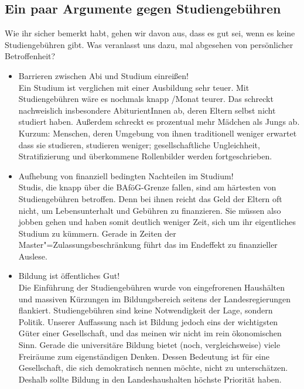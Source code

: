 \subsection*{Ein paar Argumente gegen Studiengebühren}

Wie ihr sicher bemerkt habt, gehen wir davon aus, dass es gut sei, wenn es
keine Studiengebühren gibt. Was veranlasst uns dazu, mal abgesehen von
persönlicher Betroffenheit?
\begin{itemize}
\item {Barrieren zwischen Abi und Studium einreißen!}\\Ein Studium ist
    verglichen mit einer Ausbildung sehr teuer. Mit Studiengebühren wäre es
    nochmals knapp /Monat teurer. Das schreckt nachweislich insbesondere
    AbiturientInnen ab, deren Eltern selbst nicht studiert haben. Außerdem schreckt
    es prozentual mehr Mädchen als Jungs ab. Kurzum: Menschen, deren Umgebung von
    ihnen traditionell weniger erwartet dass sie studieren, studieren weniger;
    gesellschaftliche Ungleichheit, Stratifizierung und überkommene Rollenbilder
    werden fortgeschrieben.
\item {Aufhebung von finanziell bedingten Nachteilen im Studium!}\\Studis, die
    knapp über die BAföG-Grenze fallen, sind am härtesten von Studiengebühren
    betroffen. Denn bei ihnen reicht das Geld der Eltern oft nicht, um
    Lebensunterhalt und Gebühren zu finanzieren. Sie müssen also jobben gehen und
    haben somit deutlich weniger Zeit, sich um ihr eigentliches Studium zu kümmern.
    Gerade in Zeiten der Master"=Zulassungsbeschränkung führt das im Endeffekt zu
    finanzieller Auslese.
\item {Bildung ist öffentliches Gut!}\\Die Einführung der Studiengebühren wurde
    von eingefrorenen Haushälten und massiven Kürzungen im Bildungsbereich seitens
    der Landesregierungen flankiert. Studiengebühren sind keine Notwendigkeit der
    Lage, sondern Politik. Unserer Auffassung nach ist Bildung jedoch eins der
    wichtigsten Güter einer Gesellschaft, und das meinen wir nicht im rein
    ökonomischen Sinn. Gerade die universitäre Bildung bietet (noch,
    vergleichsweise) viele Freiräume zum eigenständigen Denken. Dessen Bedeutung
    ist für eine Gesellschaft, die sich demokratisch nennen möchte, nicht zu
    unterschätzen. Deshalb sollte Bildung in den Landeshaushalten höchste Priorität
    haben.
\end{itemize}

